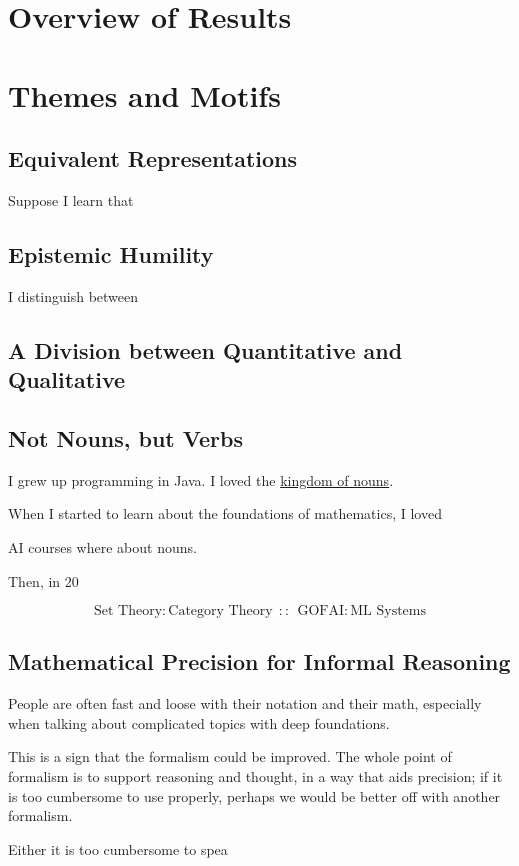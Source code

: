 
\section{}



\section{Overview of Results}
\section{Themes and Motifs}

\subsection{Equivalent Representations}

Suppose I learn that 


\subsection{Epistemic Humility}
I distinguish between 

\subsection{A Division between Quantitative and Qualitative}

\subsection{Not Nouns, but Verbs}

I grew up programming in Java. I loved the \href{https://steve-yegge.blogspot.com/2006/03/execution-in-kingdom-of-nouns.html}{kingdom of nouns}.

When I started to learn about the foundations of mathematics, 
I loved 

AI courses where about nouns. 

Then, in 20

\[
\text{Set Theory} : \text{Category Theory}
~~::~~
\text{GOFAI} : \text{ML Systems}
\]



\subsection{Mathematical Precision for Informal Reasoning}
People are often fast and loose with their notation and their math, especially when
    talking about complicated topics with deep foundations.
    
This is a sign that the formalism could be improved.
The whole point of formalism is to support reasoning and thought, 
    in a way that aids precision; if it is too cumbersome to use properly,
    perhaps we would be better off with another formalism.
    
    Either it is too cumbersome to spea
